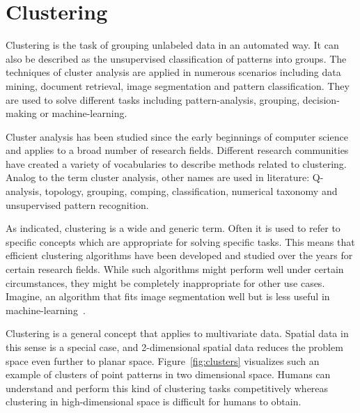 
%
%

\section{Clustering}

Clustering is the task of grouping unlabeled data in an automated way. It can also be described as the unsupervised classification of patterns into groups. The techniques of cluster analysis are applied in numerous scenarios including data mining, document retrieval, image segmentation and pattern classification. They are used to solve different tasks including pattern-analysis, grouping, decision-making or machine-learning.

Cluster analysis has been studied since the early beginnings of computer science and applies to a broad number of research fields. Different research communities have created a variety of vocabularies to describe methods related to clustering. Analog to the term cluster analysis, other names are used in literature: Q-analysis, topology, grouping, comping, classification, numerical taxonomy and unsupervised pattern recognition.

As indicated, clustering is a wide and generic term. Often it is used to refer to specific concepts which are appropriate for solving specific tasks. This means that efficient clustering algorithms have been developed and studied over the years for certain research fields. While such algorithms might perform well under certain circumstances, they might be completely inappropriate for other use cases. Imagine, an algorithm that  fits image segmentation well but is less useful in machine-learning~\cite{Meert06clustermaps, Jain99clusterreview}.

Clustering is a general concept that applies to multivariate data. Spatial data in this sense is a special case, and 2-dimensional spatial data reduces the problem space even further to planar space. Figure~\ref{fig:clusters} visualizes such an example of clusters of point patterns in two dimensional space. Humans can understand and perform this kind of clustering tasks competitively whereas clustering in high-dimensional space is difficult for humans to obtain. 

